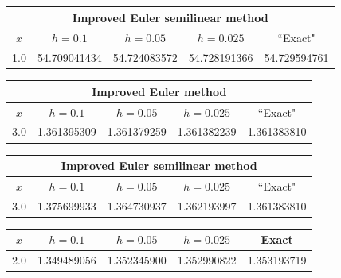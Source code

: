 \bigskip

\hspace{.75in}
{\small
\begin{tabular}{|c|r|r|r|r|}
\hline
\multicolumn{5}{|c|}{
 Improved Euler semilinear method}\\\hline
\multicolumn{1}{|c|}{$x$}&
\multicolumn{1}{|c|}{$h=0.1$}&
\multicolumn{1}{|c|}{$h=0.05$}&
\multicolumn{1}{|c|}{$h=0.025$}&
\multicolumn{1}{|c|}{``Exact"}\\ \hline
1.0 & 54.709041434 & 54.724083572 & 54.728191366 & 54.729594761 \\
\hline
\end{tabular}}

\bigskip

{\small
\begin{tabular}{|c|r|r|r|r|}
\hline
\multicolumn{5}{|c|}{Improved Euler method}\\\hline
\multicolumn{1}{|c|}{$x$}&
\multicolumn{1}{|c|}{$h=0.1$}&
\multicolumn{1}{|c|}{$h=0.05$}&
\multicolumn{1}{|c|}{$h=0.025$}&
\multicolumn{1}{|c|}{``Exact"}\\ \hline
3.0 & 1.361395309 & 1.361379259 & 1.361382239 & 1.361383810 \\
\hline
\end{tabular}}
\medskip

\bigskip

\hspace{.75in}
{\small
\begin{tabular}{|c|r|r|r|r|}
\hline
\multicolumn{5}{|c|}{Improved
 Euler semilinear method}\\\hline
\multicolumn{1}{|c|}{$x$}&
\multicolumn{1}{|c|}{$h=0.1$}&
\multicolumn{1}{|c|}{$h=0.05$}&
\multicolumn{1}{|c|}{$h=0.025$}&
\multicolumn{1}{|c|}{``Exact"}\\ \hline
3.0 & 1.375699933 & 1.364730937 & 1.362193997 & 1.361383810 \\
\hline
\end{tabular}}

\bigskip

{\small
\begin{tabular}{|c|r|r|r|r|}\hline
\multicolumn{1}{|c|}{$x$}&
\multicolumn{1}{|c|}{$h=0.1$}&
\multicolumn{1}{|c|}{$h=0.05$}&
\multicolumn{1}{|c|}{$h=0.025$}&
\multicolumn{1}{|c|}{Exact}\\ \hline
2.0 & 1.349489056 & 1.352345900 & 1.352990822 & 1.353193719\\
\hline
\end{tabular}}

